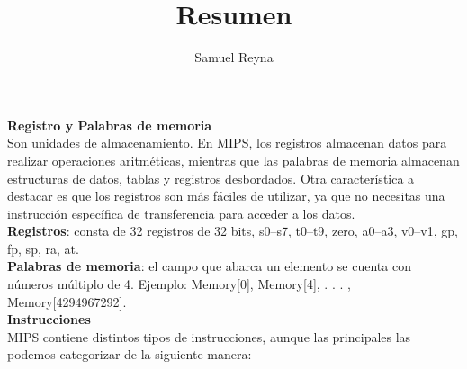 \documentclass[12pt]{article}
\title{Resumen}
\author{Samuel Reyna}
\begin{document}
\maketitle

   \textbf{Registro y Palabras de memoria}\\
      Son unidades de almacenamiento. En MIPS, los registros almacenan datos para realizar operaciones aritméticas,
      mientras que las palabras de memoria almacenan estructuras de datos, tablas y registros desbordados. Otra característica 
      a destacar es que los registros son más fáciles de utilizar, ya que no necesitas una instrucción específica de transferencia 
      para acceder a los datos.\\

      \textbf{Registros}: consta de 32 registros de 32 bits, s0–s7, t0–t9,
       zero, a0–a3, v0–v1, gp, fp, sp, ra, at.\\

      \textbf{Palabras de memoria}: el campo que abarca un elemento se cuenta con números múltiplo de 4. Ejemplo:
      Memory[0], Memory[4], . . . , Memory[4294967292].\\
     
     \textbf{Instrucciones}\\
     MIPS contiene distintos tipos de instrucciones, aunque las principales
     las podemos categorizar de la siguiente manera:
\end{document}
